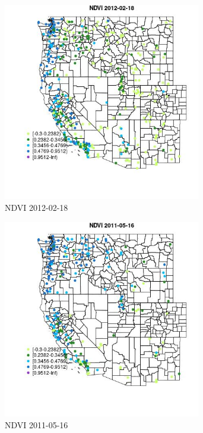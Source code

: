 \begin{figure} 
\centering  
\includegraphics[width=0.77\textwidth]{Code_Outputs/Report_ML_input_PM25_Step4_part_f_de_duplicated_aveswNAs_MapObsNDVI2012-02-18.jpg} 
\caption{\label{fig:Report_ML_input_PM25_Step4_part_f_de_duplicated_aveswNAsMapObsNDVI2012-02-18}NDVI 2012-02-18} 
\end{figure} 
 

\clearpage 

\begin{figure} 
\centering  
\includegraphics[width=0.77\textwidth]{Code_Outputs/Report_ML_input_PM25_Step4_part_f_de_duplicated_aveswNAs_MapObsNDVI2011-05-16.jpg} 
\caption{\label{fig:Report_ML_input_PM25_Step4_part_f_de_duplicated_aveswNAsMapObsNDVI2011-05-16}NDVI 2011-05-16} 
\end{figure} 
 


